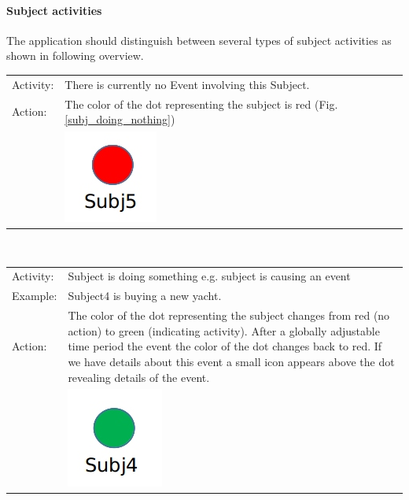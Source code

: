 \paragraph{Subject activities}
The application should distinguish between several types of subject activities as shown in following overview.

\begin{tabularx}{\textwidth}{l X}
Activity: & There is currently no Event involving this Subject.\\
Action: & The color of the dot representing the subject is red (Fig.\ref{subj_doing_nothing})\\
& \includegraphics[scale=0.3]{./img/visualization/subj_doing_nothing.png}\label{subj_doing_nothing}\\
\end{tabularx}\\

\begin{tabularx}{\textwidth}{l X}
Activity: & Subject is doing something e.g. subject is causing an event\\
Example: & Subject4 is buying a new yacht. \\
Action: & The color of the dot representing the subject changes from red (no action) to green (indicating activity). After a globally adjustable time period the event the color of the dot changes back to red. If we have details about this event a small icon appears above the dot  revealing details of the event.\\ 
& \includegraphics[scale=0.3]{./img/visualization/subj_doing_sth.png}\\
\end{tabularx}\\



